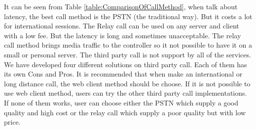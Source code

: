 It can be seen from Table \ref{table:ComparisonOfCallMethod}, when talk about latency, the best call method is the PSTN (the traditional way). But it costs a lot for international sessions.  The Relay call can be used on any server and client with a low fee. But the latency is long and sometimes unacceptable. The relay call method brings media traffic to the controller so it not possible to have it on a small or personal server. The third party call is not support by all of the services. We have developed four different solutions on third party call. Each of them has its own Cons and Pros. It is recommended that when make an international or long distance call, the web client method should be choose. If it is not possible to use web client method, users can try the other third party call implementations. If none of them works, user can choose either the PSTN which supply a good quality and high cost or the relay call which supply a poor quality but with low price.


